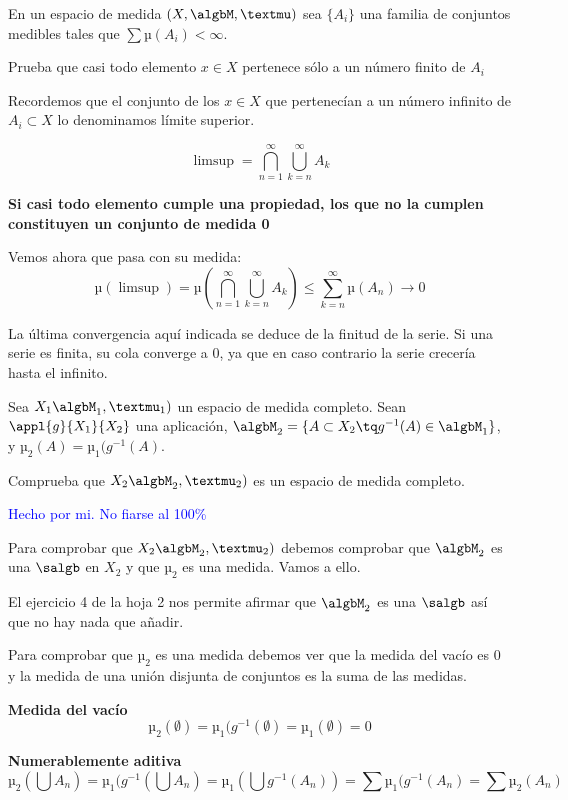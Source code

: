 \begin{problem}[10]
En un espacio de medida $(X, \algbM, µ)$ sea $\{A_i\}$ una familia de conjuntos medibles tales que $\sum µ(A_i) < \infty$.

Prueba que casi todo elemento $x \in X$ pertenece sólo a un número finito de $A_i$

\solution

Recordemos que el conjunto de los $x \in X$ que pertenecían a un número infinito de $A_i \subset X$ lo denominamos límite superior.

\[\limsup = \bigcap_{n=1}^{\infty}\bigcup_{k=n}^{\infty} A_k\]

\textbf{Si casi todo elemento cumple una propiedad, los que no la cumplen constituyen un conjunto de medida 0}

Vemos ahora que pasa con su medida:
\[µ(\limsup) = µ(\bigcap_{n=1}^{\infty}\bigcup_{k=n}^{\infty} A_k) \leq \sum_{k=n}^{\infty}µ(A_n) \rightarrow 0\]

La última convergencia aquí indicada se deduce de la finitud de la serie. Si una serie es finita, su cola converge a 0, ya que en caso contrario la serie crecería hasta el infinito.
\end{problem}

\begin{problem}[11]
Sea $X_1 \algbM_1,µ_1)$ un espacio de medida completo. Sean $\appl{g}{X_1}{X_2}$ una aplicación, $\algbM_2=\{A \subset X_2 \tq g^{-1}(A) \in \algbM_1\}$, y $µ_2(A)=µ_1(g^{-1}(A)$.

Comprueba que $X_2 \algbM_2,µ_2)$ es un espacio de medida completo.

\solution
\textcolor{blue}{Hecho por mi. No fiarse al 100\%}

Para comprobar que $X_2 \algbM_2,µ_2)$ debemos comprobar que $\algbM_2$ es una $\salgb$ en $X_2$ y que $µ_2$ es una medida. Vamos a ello.

El ejercicio 4 de la hoja 2 nos permite afirmar que $\algbM_2$ es una $\salgb$ así que no hay nada que añadir.

Para comprobar que $µ_2$ es una medida debemos ver que la medida del vacío es 0 y la medida de una unión disjunta de conjuntos es la suma de las medidas.

\textbf{Medida del vacío}
\[µ_2(\emptyset) = µ_1(g^{-1}(\emptyset) = µ_1(\emptyset) = 0\]

\textbf{Numerablemente aditiva}
\[µ_2(\bigcup A_n) =  µ_1(g^{-1}(\bigcup A_n) = µ_1(\bigcup g^{-1}(A_n)) = \sum µ_1(g^{-1}(A_n) = \sum µ_2(A_n)\]
\end{problem}

